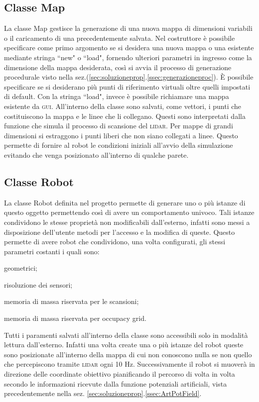 \subsection{Classe Map}
\label{ssec:ClassMap}
La classe Map gestisce la generazione di una nuova mappa di dimensioni variabili
o il caricamento di una precedentemente salvata.
Nel costruttore è possibile
specificare come primo argomento se si desidera una nuova mappa o una esistente
mediante stringa ``new" o ``load", fornendo ulteriori parametri in ingresso come
la dimensione della mappa desiderata, così si avvia il processo di generazione
procedurale visto nella sez.(\ref{sec:soluzioneprop}.\ref{ssec:generazioneproc}).
È possibile specificare se si desiderano più punti di riferimento virtuali oltre
quelli impostati di default.
Con la stringa ``load", invece è possibile richiamare una mappa esistente da
\textsc{gui}.
All'interno della classe sono salvati, come vettori, i punti che costituiscono
la mappa e le linee che li collegano. Questi sono interpretati dalla funzione
che simula il processo di scansione del \textsc{lidar}.
Per mappe di grandi dimensioni si estraggono i punti liberi che non siano
collegati a linee. Questo permette di fornire al robot le condizioni iniziali
all'avvio della simulazione evitando che venga posizionato all'interno di
qualche parete.

\subsection{Classe Robot}
\label{ssec:ClassRobot}
La classe Robot definita nel progetto permette di generare uno o più istanze di
questo oggetto permettendo così di avere un comportamento univoco.
Tali istanze condividono le stesse proprietà non modificabili dall'esterno,
infatti sono messi a disposizione dell'utente metodi per l'accesso e la
modifica di queste.
Questo permette di avere robot che condividono, una volta configurati, gli
stessi parametri costanti i quali sono:
\begin{enumerate*}[label={\alph*)},font={\bfseries}]
	\item geometrici;
	\item risoluzione dei sensori;
	\item memoria di massa riservata per le scansioni;
	\item memoria di massa riservata per occupacy grid.
\end{enumerate*}
Tutti i paramenti salvati all'interno della classe sono accessibili solo in 
modalità lettura dall'esterno.
Infatti una volta create una o più istanze del robot queste sono posizionate
all'interno della mappa di cui non conoscono nulla se non quello che
percepiscono tramite \textsc{lidar} ogni 10 \si{\hertz}.
Successivamente il robot si muoverà in direzione delle coordinate obiettivo
pianificando il percorso di volta in volta secondo le informazioni ricevute
dalla funzione potenziali artificiali, vista precedentemente nella
sez. \ref{sec:soluzioneprop}.\ref{ssec:ArtPotField}.

